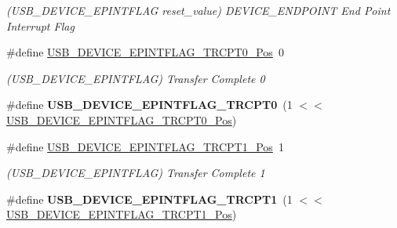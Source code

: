 \begin{DoxyCompactItemize}
\begin{DoxyCompactList}\small\item\em (U\+S\+B\+\_\+\+D\+E\+V\+I\+C\+E\+\_\+\+E\+P\+I\+N\+T\+F\+L\+A\+G reset\+\_\+value) D\+E\+V\+I\+C\+E\+\_\+\+E\+N\+D\+P\+O\+I\+N\+T End Point Interrupt Flag \end{DoxyCompactList}\item 
\hypertarget{group___s_a_m_l21___u_s_b_ga1439d482c8801ae43fbbee8a4b145aae}{}\#define \hyperlink{group___s_a_m_l21___u_s_b_ga1439d482c8801ae43fbbee8a4b145aae}{U\+S\+B\+\_\+\+D\+E\+V\+I\+C\+E\+\_\+\+E\+P\+I\+N\+T\+F\+L\+A\+G\+\_\+\+T\+R\+C\+P\+T0\+\_\+\+Pos}~0\label{group___s_a_m_l21___u_s_b_ga1439d482c8801ae43fbbee8a4b145aae}

\begin{DoxyCompactList}\small\item\em (U\+S\+B\+\_\+\+D\+E\+V\+I\+C\+E\+\_\+\+E\+P\+I\+N\+T\+F\+L\+A\+G) Transfer Complete 0 \end{DoxyCompactList}\item 
\hypertarget{group___s_a_m_l21___u_s_b_ga8aadaa86e323526b4c4e8d6a6db915a5}{}\#define {\bfseries U\+S\+B\+\_\+\+D\+E\+V\+I\+C\+E\+\_\+\+E\+P\+I\+N\+T\+F\+L\+A\+G\+\_\+\+T\+R\+C\+P\+T0}~(1 $<$$<$ \hyperlink{group___s_a_m_l21___u_s_b_ga1439d482c8801ae43fbbee8a4b145aae}{U\+S\+B\+\_\+\+D\+E\+V\+I\+C\+E\+\_\+\+E\+P\+I\+N\+T\+F\+L\+A\+G\+\_\+\+T\+R\+C\+P\+T0\+\_\+\+Pos})\label{group___s_a_m_l21___u_s_b_ga8aadaa86e323526b4c4e8d6a6db915a5}

\item 
\hypertarget{group___s_a_m_l21___u_s_b_gac13e74216b00808038841a0c1b3e66da}{}\#define \hyperlink{group___s_a_m_l21___u_s_b_gac13e74216b00808038841a0c1b3e66da}{U\+S\+B\+\_\+\+D\+E\+V\+I\+C\+E\+\_\+\+E\+P\+I\+N\+T\+F\+L\+A\+G\+\_\+\+T\+R\+C\+P\+T1\+\_\+\+Pos}~1\label{group___s_a_m_l21___u_s_b_gac13e74216b00808038841a0c1b3e66da}

\begin{DoxyCompactList}\small\item\em (U\+S\+B\+\_\+\+D\+E\+V\+I\+C\+E\+\_\+\+E\+P\+I\+N\+T\+F\+L\+A\+G) Transfer Complete 1 \end{DoxyCompactList}\item 
\hypertarget{group___s_a_m_l21___u_s_b_ga4ca09d154155fb724cf0981e2a6b11ef}{}\#define {\bfseries U\+S\+B\+\_\+\+D\+E\+V\+I\+C\+E\+\_\+\+E\+P\+I\+N\+T\+F\+L\+A\+G\+\_\+\+T\+R\+C\+P\+T1}~(1 $<$$<$ \hyperlink{group___s_a_m_l21___u_s_b_gac13e74216b00808038841a0c1b3e66da}{U\+S\+B\+\_\+\+D\+E\+V\+I\+C\+E\+\_\+\+E\+P\+I\+N\+T\+F\+L\+A\+G\+\_\+\+T\+R\+C\+P\+T1\+\_\+\+Pos})\label{group___s_a_m_l21___u_s_b_ga4ca09d154155fb724cf0981e2a6b11ef}


\end{DoxyCompactItemize}

